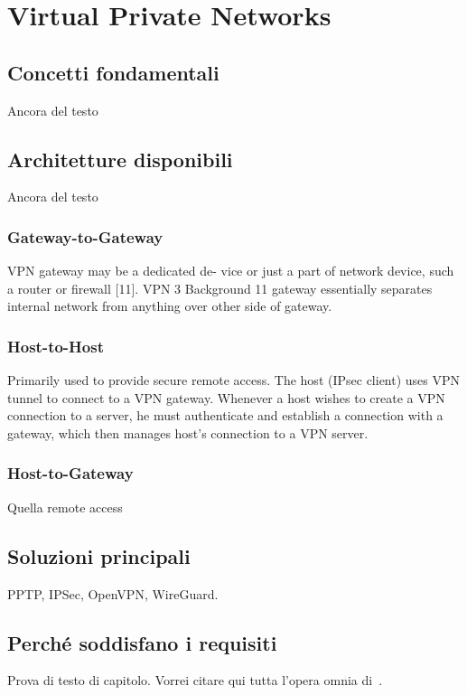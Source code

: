 \section{Virtual Private Networks }

\subsection{Concetti fondamentali}
Ancora del testo

\subsection{Architetture disponibili}
Ancora del testo

\subsubsection{Gateway-to-Gateway}
VPN gateway may be a dedicated de- vice or just a part of network device, such a router or firewall [11]. VPN
3 Background 11
gateway essentially separates internal network from anything over other side of gateway.


\subsubsection{Host-to-Host}
Primarily used to provide secure remote access. The host (IPsec client) uses VPN tunnel to connect to a VPN gateway. Whenever a host wishes to create a VPN connection to a server, he must authenticate and establish a connection with a gateway, which then manages host's connection to a VPN server.

\subsubsection{Host-to-Gateway}
Quella remote access

\subsection{Soluzioni principali}
PPTP, IPSec, OpenVPN, WireGuard.

\subsection{Perché soddisfano i requisiti}
Prova di testo di capitolo. Vorrei citare qui tutta l'opera omnia di~\cite{IEEE:1990,WIKI:INTEROP,BOX:1997,AHL:1996}.

